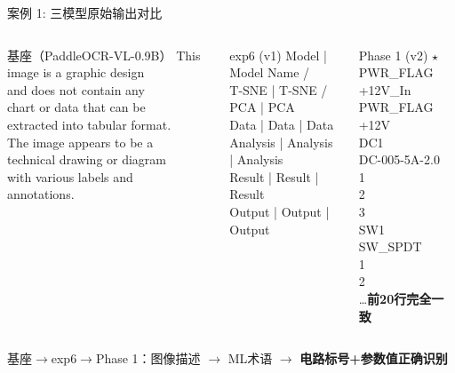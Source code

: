\documentclass[10pt,aspectratio=169,table]{beamer}
\begin{document}
\begin{frame}{案例 1: 三模型原始输出对比}
  \begin{columns}[T]
      \begin{block}{\footnotesize 基座（PaddleOCR-VL-0.9B）}
        \ttfamily\tiny
        This image is a graphic design\\
        and does not contain any\\
        chart or data that can be\\
        extracted into tabular format.\\
        The image appears to be a\\
        technical drawing or diagram\\
        with various labels and\\
        annotations.
      \end{block}
      \begin{block}{\footnotesize exp6 (v1)}
        \ttfamily\tiny
        Model | Model Name /\\
        T-SNE | T-SNE / PCA | PCA\\
        Data | Data | Data\\
        Analysis | Analysis | Analysis\\
        Result | Result | Result\\
        Output | Output | Output
      \end{block}
      \begin{block}{\footnotesize Phase 1 (v2) $\star$}
        \ttfamily\tiny
        PWR\_FLAG\\
        +12V\_In\\
        PWR\_FLAG\\
        +12V\\
        DC1\\
        DC-005-5A-2.0\\
        1\\
        2\\
        3\\
        SW1\\
        SW\_SPDT\\
        1\\
        2\\
        \ldots\textbf{前20行完全一致}
      \end{block}
  \end{columns}
  \vspace{0.2cm}
  \begin{center}
    \footnotesize 基座$\to$exp6$\to$Phase 1：图像描述 $\to$ ML术语 $\to$ \textbf{电路标号+参数值正确识别}
  \end{center}
\end{frame}
\end{document}

